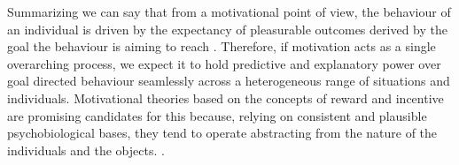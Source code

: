 
Summarizing we can say that from a motivational point of view, the behaviour of an individual is driven by the expectancy of pleasurable outcomes derived by the goal the behaviour is aiming to reach \cite{berridge2004motivation}. Therefore, if motivation acts as a single overarching process, we expect it to hold predictive and explanatory power over goal directed behaviour seamlessly across a heterogeneous range of situations and individuals. Motivational theories based on the concepts of reward and incentive are promising candidates for this because, relying on consistent and plausible psychobiological bases, they tend to operate abstracting from the nature of the individuals and the objects. \cite{ikemoto1999role,berridge1998role,salamone2002motivational,berridge2004motivation,armony2013cambridge,corbit2015learning}.

